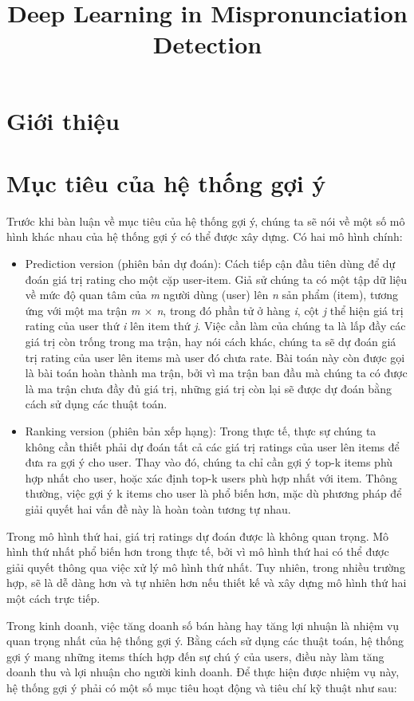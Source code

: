 \documentclass[14pt]{article}
\title{\vspace{-1.5cm} Deep Learning in Mispronunciation Detection}
\date{}
\begin{document}
	\section{Giới thiệu}
	 	
	\section{Mục tiêu của hệ thống gợi ý}
	Trước khi bàn luận về mục tiêu của hệ thống gợi ý, chúng ta sẽ nói về một số mô hình khác nhau của hệ thống gợi ý có thể được xây dựng. Có hai mô hình chính:
	\begin{itemize}
		\item Prediction version (phiên bản dự đoán): Cách tiếp cận đầu tiên dùng để dự đoán giá trị rating cho một cặp user-item. Giả sử chúng ta có một tập dữ liệu về mức độ quan tâm của \textit{m} người dùng (user) lên \textit{n} sản phẩm (item), tương ứng với một ma trận \textit{m $\times$ n}, trong đó phần tử ở hàng \textit{i}, cột \textit{j} thể hiện giá trị rating của user thứ \textit{i} lên item thứ \textit{j}. Việc cần làm của chúng ta là lấp đầy các giá trị còn trống trong ma trận, hay nói cách khác, chúng ta sẽ dự đoán giá trị rating của user lên items mà user đó chưa rate. Bài toán này còn được gọi là bài toán hoàn thành ma trận, bởi vì ma trận ban đầu mà chúng ta có được là ma trận chưa đầy đủ giá trị, những giá trị còn lại sẽ được dự đoán bằng cách sử dụng các thuật toán.
		
		\item Ranking version (phiên bản xếp hạng): Trong thực tế, thực sự chúng ta không cần thiết phải dự đoán tất cả các giá trị ratings của user lên items để đưa ra gợi ý cho user. Thay vào đó, chúng ta chỉ cần gợi ý top-k items phù hợp nhất cho user, hoặc xác định top-k users phù hợp nhất với item. Thông thường, việc gợi ý k items cho user là phổ biến hơn, mặc dù phương pháp để giải quyết hai vấn đề này là hoàn toàn tương tự nhau. 
	\end{itemize}
	
	Trong mô hình thứ hai, giá trị ratings dự đoán được là không quan trọng. Mô hình thứ nhất phổ biến hơn trong thực tế, bởi vì mô hình thứ hai có thể được giải quyết thông qua việc xử lý mô hình thứ nhất. Tuy nhiên, trong nhiều trường hợp, sẽ là dễ dàng hơn và tự nhiên hơn nếu thiết kế và xây dựng mô hình thứ hai một cách trực tiếp.
	
	Trong kinh doanh, việc tăng doanh số bán hàng hay tăng lợi nhuận là nhiệm vụ quan trọng nhất của hệ thống gợi ý. Bằng cách sử dụng các thuật toán, hệ thống gợi ý mang những items thích hợp đến sự chú ý của users, điều này làm tăng doanh thu và lợi nhuận cho người kinh doanh. Để thực hiện được nhiệm vụ này, hệ thống gợi ý phải có một số mục tiêu hoạt động và tiêu chí kỹ thuật như sau:
	
\end{document}
